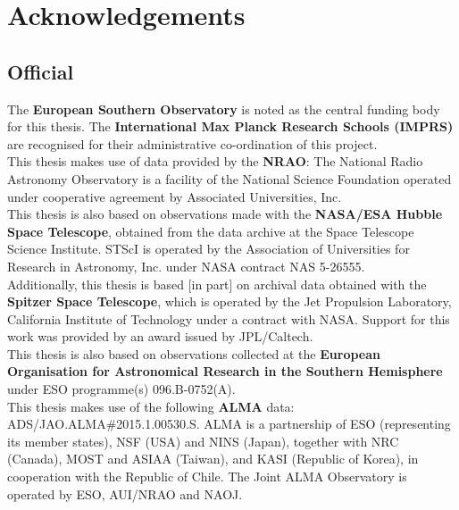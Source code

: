 

\chapter*{Acknowledgements}

\section*{Official}
The {\bf European Southern Observatory} is noted as the central funding body for this thesis. The {\bf International Max Planck Research Schools (IMPRS)} are recognised for their administrative co-ordination of this project.\\
This thesis makes use of data provided by the {\bf NRAO}: The National Radio Astronomy Observatory is a facility of the National Science Foundation operated under cooperative agreement by Associated Universities, Inc. \\
This thesis is also based on observations made with the {\bf NASA/ESA Hubble Space Telescope}, obtained from the data archive at the Space Telescope Science Institute. STScI is operated by the Association of Universities for Research in Astronomy, Inc. under NASA contract NAS 5-26555.\\
Additionally, this thesis is based [in part] on archival data obtained with the {\bf Spitzer Space Telescope}, which is operated by the Jet Propulsion Laboratory, California Institute of Technology under a contract with NASA. Support for this work was provided by an award issued by JPL/Caltech.\\
This thesis is also based on observations collected at the {\bf European Organisation for Astronomical Research in the Southern Hemisphere} under ESO programme(s) 096.B-0752(A).\\
This thesis makes use of the following {\bf ALMA} data: ADS/JAO.ALMA\#2015.1.00530.S. ALMA is a partnership of ESO (representing its member states), NSF (USA) and NINS (Japan), together with NRC (Canada), MOST and ASIAA (Taiwan), and KASI (Republic of Korea), in cooperation with the Republic of Chile. The Joint ALMA Observatory is operated by ESO, AUI/NRAO and NAOJ.


